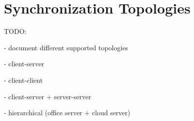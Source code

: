 
\section{Synchronization Topologies}
\label{sec:histo.topologies}

TODO:

- document different supported topologies

- client-server

- client-client

- client-server + server-server

- hierarchical (office server + cloud server)
